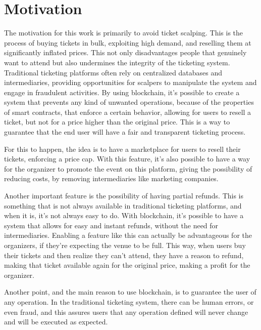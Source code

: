 \section{Motivation}

The motivation for this work is primarily to avoid ticket scalping. This is the process of buying tickets in bulk, exploiting high demand, and reselling them at significantly inflated prices. This not only disadvantages people that genuinely want to attend but also undermines the integrity of the ticketing system. Traditional ticketing platforms often rely on centralized databases and intermediaries, providing opportunities for scalpers to manipulate the system and engage in fraudulent activities. By using blockchain, it's possible to create a system that prevents any kind of unwanted operations, because of the properties of smart contracts, that enforce a certain behavior, allowing for users to resell a ticket, but not for a price higher than the original price. This is a way to guarantee that the end user will have a fair and transparent ticketing process.

For this to happen, the idea is to have a marketplace for users to resell their tickets, enforcing a price cap. With this feature, it's also possible to have a way for the organizer to promote the event on this platform, giving the possibility of reducing costs, by removing intermediaries like marketing companies.

Another important feature is the possibility of having partial refunds. This is something that is not always available in traditional ticketing platforms, and when it is, it's not always easy to do. With blockchain, it's possible to have a system that allows for easy and instant refunds, without the need for intermediaries. Enabling a feature like this can actually be advantageous for the organizers, if they're expecting the venue to be full. This way, when users buy their tickets and then realize they can't attend, they have a reason to refund, making that ticket available again for the original price, making a profit for the organizer.

Another point, and the main reason to use blockchain, is to guarantee the user of any operation. In the traditional ticketing system, there can be human errors, or even fraud, and this assures users that any operation defined will never change and will be executed as expected.